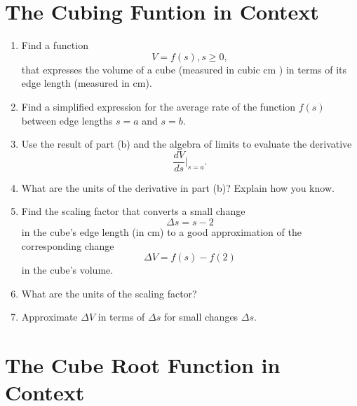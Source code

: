 \documentclass{ximera}
\begin{document}
\section{The Cubing Funtion in Context}
\begin{example} \label{ExKK354r3}

\begin{enumerate}

\item Find a function 
\[
   V = f(s) , s\geq 0 ,
\]
that expresses the volume of a cube (measured in cubic cm ) in terms of its edge length (measured in cm).

\item Find a simplified expression for the average rate of the function $f(s)$ between edge lengths $s=a$ and $s=b$.

\item Use the result of part (b) and the  algebra of limits to evaluate the derivative
\[
       \frac{dV}{ds}\Big|_{s=a}.
\]

\item What are the units of the derivative in part (b)? Explain how you know.

\item Find the scaling factor that converts a small change
\[
  \Delta s = s - 2
\]
in the cube's edge length (in cm) to a good approximation of the corresponding change
\[
   \Delta V = f(s) - f(2)
\]
in the cube's volume. 

\item What are the units of the scaling factor?

\item Approximate $\Delta V$ in terms of $\Delta s$ for small changes $\Delta s$.
\end{enumerate}
\end{example}



\section{The Cube Root Function in Context}
\end{document}
